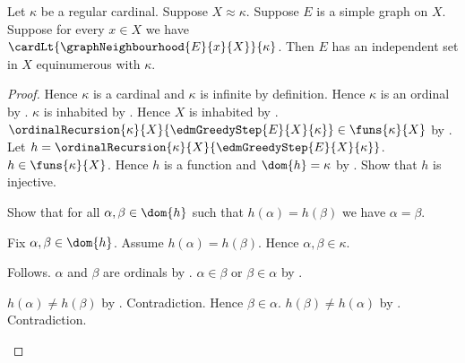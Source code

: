 \begin{theorem}\label{regular_small_degree_independent}
    Let $\kappa$ be a regular cardinal.
    Suppose $X\approx\kappa$.
    Suppose $E$ is a simple graph on $X$.
    Suppose for every $x\in X$ we have
        $\cardLt{\graphNeighbourhood{E}{x}{X}}{\kappa}$.
    Then $E$ has an independent set in $X$ equinumerous with $\kappa$.
\end{theorem}
\begin{proof}
    Hence $\kappa$ is a cardinal and $\kappa$ is infinite by definition.
    Hence $\kappa$ is an ordinal by .
    $\kappa$ is inhabited by .
    Hence $X$ is inhabited by .
    $\ordinalRecursion{\kappa}{X}{\edmGreedyStep{E}{X}{\kappa}}
        \in\funs{\kappa}{X}$ by
        .
    Let $h=\ordinalRecursion{\kappa}{X}
        {\edmGreedyStep{E}{X}{\kappa}}$.
    $h\in\funs{\kappa}{X}$.
    Hence $h$ is a function and $\dom{h}=\kappa$ by
        .
    Show that $h$ is injective.
    \begin{subproof}
        Show that for all $\alpha,\beta\in\dom{h}$ such that
            $h(\alpha)=h(\beta)$ we have $\alpha=\beta$.
        \begin{subproof}
            Fix $\alpha,\beta\in\dom{h}$.
            Assume $h(\alpha)=h(\beta)$.
            Hence $\alpha,\beta\in\kappa$.
            \begin{byCase}
                    Follows.
                    $\alpha$ and $\beta$ are ordinals by
                        .
                    $\alpha\in\beta$ or $\beta\in\alpha$ by
                        .
                    \begin{byCase}
                            $h(\alpha)\neq h(\beta)$ by
                                .
                            Contradiction.
                            Hence $\beta\in\alpha$.
                            $h(\beta)\neq h(\alpha)$ by
                                .
                            Contradiction.
                    \end{byCase}
            \end{byCase}
        \end{subproof}

\end{subproof}
\end{proof}

